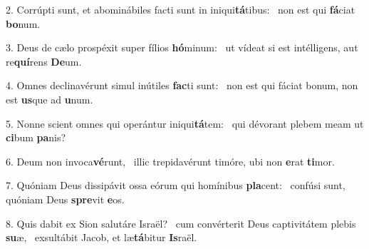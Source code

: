 2. Corrúpti sunt, et abominábiles facti sunt in iniqui\textbf{tá}tibus: \ast\  non est qui \textbf{fá}ciat \textbf{bo}num.\

3. Deus de cælo prospéxit super fílios \textbf{hó}minum: \ast\  ut vídeat si est intélligens, aut re\textbf{quí}rens \textbf{De}um.\

4. Omnes declinavérunt simul inútiles \textbf{fac}ti sunt: \ast\  non est qui fáciat bonum, non est \textbf{us}que ad \textbf{u}num.\

5. Nonne scient omnes qui operántur iniqui\textbf{tá}tem: \ast\  qui dévorant plebem meam ut \textbf{ci}bum \textbf{pa}nis?\

6. Deum non invoca\textbf{vé}runt, \ast\  illic trepidavérunt timóre, ubi non \textbf{e}rat \textbf{ti}mor.\

7. Quóniam Deus dissipávit ossa eórum qui homínibus \textbf{pla}cent: \ast\  confúsi sunt, quóniam Deus \textbf{spre}vit \textbf{e}os.\

8. Quis dabit ex Sion salutáre Israël? \dag\  cum convérterit Deus captivitátem plebis \textbf{su}æ, \ast\  exsultábit Jacob, et læ\textbf{tá}bitur \textbf{Is}raël.\

